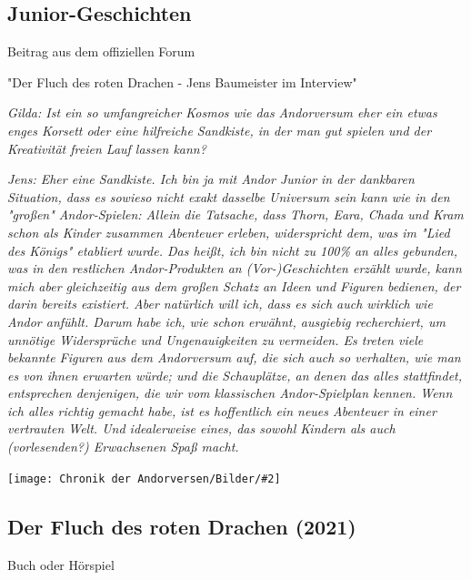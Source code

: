 \documentclass[10pt, a4paper, oneside]{book}
\newcommand{\produkt}[1]{%
    \section{#1}%
    \label{Produkt: #1}%
}
\newcommand{\bildmitts}[2][height=0.32\textwidth,width=0.48\textwidth,keepaspectratio]{%
    \begin{center}
        \texttt{[image: Chronik der Andorversen/Bilder/\#2]}
    \end{center}
}
\begin{document}
\begin{multicols}{2}

\begin{chapterbox}


    \chapter{Junior-Geschichten}
    
    \begin{center}
        Beitrag aus dem offiziellen Forum

        "Der Fluch des roten Drachen - Jens Baumeister im Interview"
    \end{center}

    \textit{Gilda: Ist ein so umfangreicher Kosmos wie das Andorversum eher ein etwas enges Korsett oder eine hilfreiche Sandkiste, in der man gut spielen und der Kreativität freien Lauf lassen kann?}

    \textit{Jens: Eher eine Sandkiste. Ich bin ja mit Andor Junior in der dankbaren Situation, dass es sowieso nicht exakt dasselbe Universum sein kann wie in den "großen" Andor-Spielen: Allein die Tatsache, dass Thorn, Eara, Chada und Kram schon als Kinder zusammen Abenteuer erleben, widerspricht dem, was im "Lied des Königs" etabliert wurde. Das heißt, ich bin nicht zu 100\% an alles gebunden, was in den restlichen Andor-Produkten an (Vor-)Geschichten erzählt wurde, kann mich aber gleichzeitig aus dem großen Schatz an Ideen und Figuren bedienen, der darin bereits existiert. Aber natürlich will ich, dass es sich auch wirklich wie Andor anfühlt. Darum habe ich, wie schon erwähnt, ausgiebig recherchiert, um unnötige Widersprüche und Ungenauigkeiten zu vermeiden. Es treten viele bekannte Figuren aus dem Andorversum auf, die sich auch so verhalten, wie man es von ihnen erwarten würde; und die Schauplätze, an denen das alles stattfindet, entsprechen denjenigen, die wir vom klassischen Andor-Spielplan kennen. Wenn ich alles richtig gemacht habe, ist es hoffentlich ein neues Abenteuer in einer vertrauten Welt. Und idealerweise eines, das sowohl Kindern als auch (vorlesenden?) Erwachsenen Spaß macht.}

    \bildmitts[width=\textwidth]{Andor Junior Schlussbild.jpg}

\end{chapterbox}




\produkt{Der Fluch des roten Drachen (2021)}

\begin{center}
    Buch oder Hörspiel
\end{center}


\end{multicols}
\end{document}
